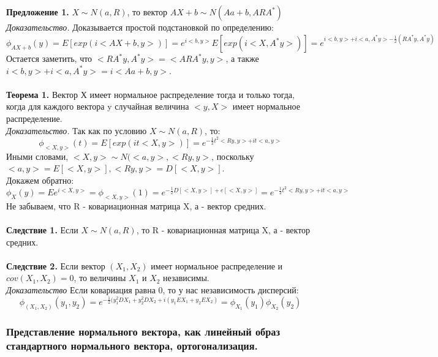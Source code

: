 \textbf{Предложение 1.} $X\sim N(a, R)$, то вектор $AX + b\sim N(Aa + b, ARA^*)$\\
\textit{Доказательство.} Доказывается простой подстановкой по определению:\\
$\phi_{AX + b}(y) =  E[exp(i<AX + b, y>)] = e^{i<b, y>}E[exp(i<X, A^*y>)] = e^{i<b, y> + i<a, A^*y> - \frac{1}{2}(RA^*y, A^*y)}$\\
Остается заметить, что $<RA^*y, A^*y> = <ARA^*y, y>$, а также $i<b, y> + i<a, A^*y>  = i<Aa + b, y>$.\\
\\
\textbf{Теорема 1.} Вектор Х имеет нормальное распределение тогда и только тогда, когда для каждого вектора y случайная величина $<y, X>$ имеет нормальное распределение.\\
\textit{Доказательство.} Так как по условию $X \sim N(a, R)$, то:\\
$$\phi_{<X, y>}(t) = E[exp(it<X, y>)] = e^{-\frac{1}{2}t^2<Ry, y> + it<a, y>}$$
Иными словами, $<X, y> \sim N(<a, y>, <Ry, y>$, поскольку $<a, y> = E[<X, y>], <Ry, y> = D[<X, y>]$.\\
Докажем обратно:\\
$$\phi_{X}(y) = Ee^{i<X, y>} = \phi_{<X, y>}(1) = e^{-\frac{1}{2}D[<X, y>] + e[<X, y>]} = e^{-\frac{1}{2}t^2<Ry, y> + it<a, y>}$$
Не забываем, что R - ковариационная матрица X, а - вектор средних.\\
\\
\textbf{Следствие 1.} Если $X \sim N(a, R)$, то R - ковариационная матрица X, а - вектор средних.\\
\\
\textbf{Следствие 2.} Если вектор $(X_1, X_2)$ имеет нормальное распределение и $cov(X_1, X_2) = 0$, то величины $X_1$ и $X_2$ независимы.\\
\textit{Доказательство} Если ковариация равна 0, то у нас независимость дисперсий:\\
$$\phi_{(X_1, X_2)}(y_1, y_2) = e^{-\frac{1}{2}(y_1^2DX_1 + y_2^2DX_2 + i(y_1EX_1 + y_2EX_2)} = \phi_{X_1}(y_1)\phi_{X_2}(y_2)$$

\subsubsection{Представление нормального вектора, как линейный образ стандартного нормального вектора, ортогонализация.}

